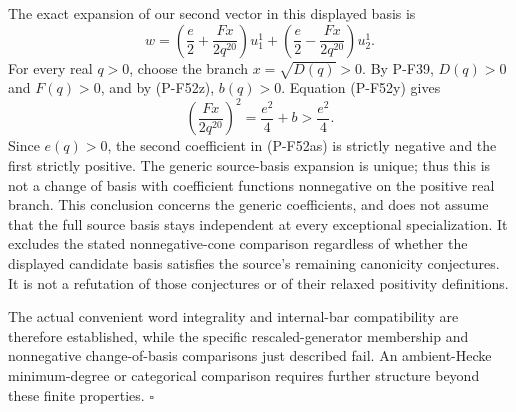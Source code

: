 The exact expansion of our second vector in this displayed
basis is
\[
        w=\left(\frac e2+\frac{Fx}{2q^{20}}\right)u_1^1
             +\left(\frac e2-\frac{Fx}{2q^{20}}\right)u_2^1.
                                                               \tag{P-F52as}
\]
For every real $q>0$, choose the branch $x=\sqrt{D(q)}>0$.
By P-F39, $D(q)>0$ and $F(q)>0$, and by (P-F52z),
$b(q)>0$. Equation (P-F52y) gives
\[
       \left(\frac{Fx}{2q^{20}}\right)^2
                          =\frac{e^2}{4}+b>\frac{e^2}{4}.
\]
Since $e(q)>0$, the second coefficient in (P-F52as) is
strictly negative and the first strictly positive.
The generic source-basis expansion is unique; thus this
is not a change of basis with coefficient functions
nonnegative on the positive real branch. This conclusion
concerns the generic coefficients, and does not assume
that the full source basis stays independent at every
exceptional specialization. It excludes the stated
nonnegative-cone comparison regardless of whether the
displayed candidate basis satisfies the source's remaining
canonicity conjectures. It is not a refutation of those
conjectures or of their relaxed positivity definitions.

The actual convenient word integrality and internal-bar
compatibility are therefore established, while the
specific rescaled-generator membership and nonnegative
change-of-basis comparisons just described fail.
An ambient-Hecke minimum-degree or categorical comparison
requires further structure beyond these finite properties.
\hfill$\square$

